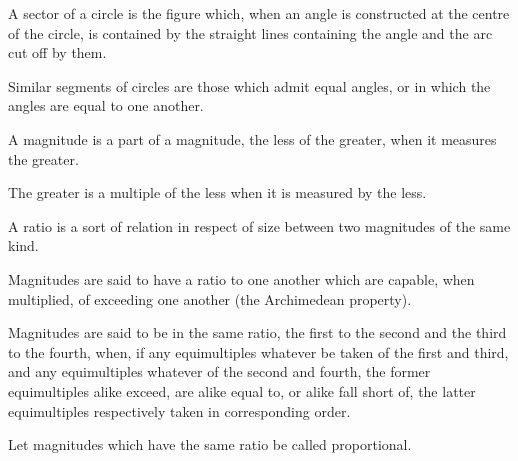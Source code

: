 \documentclass{rrxiv}
\begin{document}
\begin{scope}
\label{def:III.10}
A sector of a circle is the figure which, when an angle is constructed
at the centre of the circle, is contained by the straight lines
containing the angle and the arc cut off by them.
\end{scope}

\begin{scope}
\label{def:III.11}
Similar segments of circles are those which admit equal angles, or in
which the angles are equal to one another.
\end{scope}


\begin{scope}
\label{def:V.1}
A magnitude is a part of a magnitude, the less of the greater, when
it measures the greater.
\end{scope}

\begin{scope}
\label{def:V.2}
The greater is a multiple of the less when it is measured by the less.
\end{scope}

\begin{scope}
\label{def:V.3}
A ratio is a sort of relation in respect of size between two
magnitudes of the same kind.
\end{scope}

\begin{scope}
\label{def:V.4}
Magnitudes are said to have a ratio to one another which are capable,
when multiplied, of exceeding one another (the Archimedean property).
\end{scope}

\begin{scope}
\label{def:V.5}
Magnitudes are said to be in the same ratio, the first to the second
and the third to the fourth, when, if any equimultiples whatever be
taken of the first and third, and any equimultiples whatever of the
second and fourth, the former equimultiples alike exceed, are alike
equal to, or alike fall short of, the latter equimultiples respectively
taken in corresponding order.
\end{scope}

\begin{scope}
\label{def:V.6}
Let magnitudes which have the same ratio be called proportional.
\end{scope}
\end{document}
